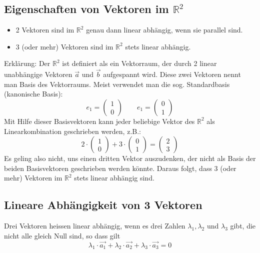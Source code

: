 \subsection{Eigenschaften von Vektoren im $\mathbb{R}^2$}
\begin{itemize}
	\item 2 Vektoren sind im $\mathbb{R}^2$ genau dann linear abhängig, wenn sie parallel sind.
	\item 3 (oder mehr) Vektoren sind im $\mathbb{R}^2$ stets linear abhängig.
\end{itemize}
Erklärung: Der $\mathbb{R}^2$ ist definiert als ein Vektorraum, der durch 2 linear unabhängige Vektoren $\vec{a}$ und $\vec{b}$ aufgespannt wird. Diese zwei Vektoren nennt man Basis des Vektorraums. Meist verwendet man die sog. Standardbasis (kanonische Basis):
\begin{equation*}
e_1 = \begin{pmatrix}1\\0\end{pmatrix}\quad\quad e_1 = \begin{pmatrix}0\\1\end{pmatrix}
\end{equation*}
Mit Hilfe dieser Basisvektoren kann jeder beliebige Vektor des $\mathbb{R}^2$ als Linearkombination geschrieben werden, z.B.:
\begin{equation*}
2\cdot \begin{pmatrix}1\\0\end{pmatrix} + 3\cdot \begin{pmatrix}0\\1\end{pmatrix} = \begin{pmatrix}2\\3\end{pmatrix}
\end{equation*}
Es geling also nicht, uns einen dritten Vektor auszudenken, der nicht als Basis der beiden Basisvektoren geschrieben werden könnte. Daraus folgt, dass 3 (oder mehr) Vektoren im $\mathbb{R}^2$ stets linear abhängig sind.
\subsection{Lineare Abhängigkeit von 3 Vektoren}
Drei Vektoren heissen linear abhängig, wenn es drei Zahlen $\lambda_1, \lambda_2$ und $\lambda_3$ gibt, die nicht alle gleich Null sind, so dass gilt
\begin{equation*}
\lambda_1 \cdot \vec{a_1} + \lambda_2 \cdot \vec{a_2} + \lambda_3 \cdot \vec{a_3} = 0 
\end{equation*}
